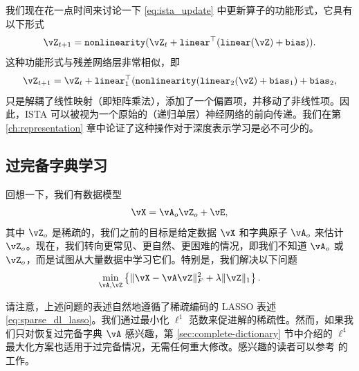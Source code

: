 \documentclass[../../book-main.tex]{subfiles}
\begin{document}
我们现在花一点时间来讨论一下 \eqref{eq:ista_update} 中更新算子的功能形式，它具有以下形式
\begin{equation}
    \vZ_{t + 1} = \texttt{nonlinearity}(\vZ_{t} + \texttt{linear}^{\top}(\texttt{linear}(\vZ) + \texttt{bias})).
\end{equation}
这种功能形式与残差网络层非常相似，即
\begin{equation}
    \vZ_{t + 1} = \vZ_{t} + \texttt{linear}_{1}^{\top}(\texttt{nonlinearity}(\texttt{linear}_{2}(\vZ) + \texttt{bias}_{1}) + \texttt{bias}_{2},
\end{equation}
只是解耦了线性映射（即矩阵乘法），添加了一个偏置项，并移动了非线性项。因此，ISTA 可以被视为一个原始的（递归单层）神经网络的前向传递。我们在第 \ref{ch:representation} 章中论证了这种操作对于深度表示学习是必不可少的。



\subsection{过完备字典学习}

回想一下，我们有数据模型
\begin{equation}
    \vX = \vA_{o}\vZ_{o} + \vE,
\end{equation}
其中 \(\vZ_{o}\) 是稀疏的，我们之前的目标是给定数据 \(\vX\) 和字典原子 \(\vA_{o}\) 来估计 \(\vZ_{o}\)。现在，我们转向更常见、更自然、更困难的情况，即我们不知道 \(\vA_{o}\) 或 \(\vZ_{o}\)，而是试图从大量数据中学习它们。特别是，我们解决以下问题
\begin{equation}
    \min_{\vA, \vZ}\bc{\norm{\vX - \vA\vZ}_{F}^{2} + \lambda \norm{\vZ}_{1}}.
    \label{eqn:DL-overcomplete}
\end{equation}
\begin{remark}
请注意，上述问题的表述自然地遵循了稀疏编码的 LASSO 表述 \eqref{eq:sparse_dl_lasso}。我们通过最小化 $\ell^1$ 范数来促进解的稀疏性。然而，如果我们只对恢复过完备字典 $\vA$ 感兴趣，第 \ref{sec:complete-dictionary} 节中介绍的 $\ell^4$ 最大化方案也适用于过完备情况，无需任何重大修改。感兴趣的读者可以参考 \cite{Qu2020Geometric} 的工作。
\end{remark}
\end{document}
